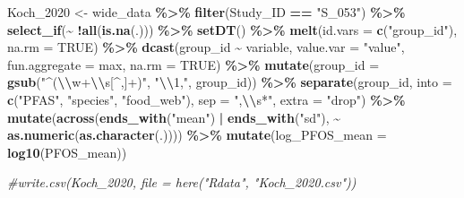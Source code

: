 \documentclass[
]{article}
\newenvironment{Shaded}{\begin{snugshade}}{\end{snugshade}}
\newcommand{\AttributeTok}[1]{\textcolor[rgb]{0.13,0.29,0.53}{#1}}
\newcommand{\CommentTok}[1]{\textcolor[rgb]{0.56,0.35,0.01}{\textit{#1}}}
\newcommand{\ConstantTok}[1]{\textcolor[rgb]{0.56,0.35,0.01}{#1}}
\newcommand{\FunctionTok}[1]{\textcolor[rgb]{0.13,0.29,0.53}{\textbf{#1}}}
\newcommand{\NormalTok}[1]{#1}
\newcommand{\OtherTok}[1]{\textcolor[rgb]{0.56,0.35,0.01}{#1}}
\newcommand{\SpecialCharTok}[1]{\textcolor[rgb]{0.81,0.36,0.00}{\textbf{#1}}}
\newcommand{\StringTok}[1]{\textcolor[rgb]{0.31,0.60,0.02}{#1}}
\begin{document}
\begin{Shaded}
\begin{Highlighting}[]
\NormalTok{Koch\_2020 }\OtherTok{\textless{}{-}}\NormalTok{ wide\_data }\SpecialCharTok{\%\textgreater{}\%} 
  \FunctionTok{filter}\NormalTok{(Study\_ID }\SpecialCharTok{==} \StringTok{"S\_053"}\NormalTok{) }\SpecialCharTok{\%\textgreater{}\%}
  \FunctionTok{select\_if}\NormalTok{(}\SpecialCharTok{\textasciitilde{}} \SpecialCharTok{!}\FunctionTok{all}\NormalTok{(}\FunctionTok{is.na}\NormalTok{(.))) }\SpecialCharTok{\%\textgreater{}\%} 
  \FunctionTok{setDT}\NormalTok{() }\SpecialCharTok{\%\textgreater{}\%} 
  \FunctionTok{melt}\NormalTok{(}\AttributeTok{id.vars =} \FunctionTok{c}\NormalTok{(}\StringTok{"group\_id"}\NormalTok{), }\AttributeTok{na.rm =} \ConstantTok{TRUE}\NormalTok{) }\SpecialCharTok{\%\textgreater{}\%} 
  \FunctionTok{dcast}\NormalTok{(group\_id }\SpecialCharTok{\textasciitilde{}}\NormalTok{ variable, }\AttributeTok{value.var =} \StringTok{"value"}\NormalTok{, }\AttributeTok{fun.aggregate =}\NormalTok{ max, }\AttributeTok{na.rm =} \ConstantTok{TRUE}\NormalTok{) }\SpecialCharTok{\%\textgreater{}\%} 
  \FunctionTok{mutate}\NormalTok{(}\AttributeTok{group\_id =} \FunctionTok{gsub}\NormalTok{(}\StringTok{"\^{}(}\SpecialCharTok{\textbackslash{}\textbackslash{}}\StringTok{w+}\SpecialCharTok{\textbackslash{}\textbackslash{}}\StringTok{s[\^{},]+)"}\NormalTok{, }\StringTok{"}\SpecialCharTok{\textbackslash{}\textbackslash{}}\StringTok{1,"}\NormalTok{, group\_id)) }\SpecialCharTok{\%\textgreater{}\%} 
  \FunctionTok{separate}\NormalTok{(group\_id, }\AttributeTok{into =} \FunctionTok{c}\NormalTok{(}\StringTok{"PFAS"}\NormalTok{, }\StringTok{"species"}\NormalTok{, }\StringTok{"food\_web"}\NormalTok{), }\AttributeTok{sep =} \StringTok{",}\SpecialCharTok{\textbackslash{}\textbackslash{}}\StringTok{s*"}\NormalTok{, }\AttributeTok{extra =} \StringTok{"drop"}\NormalTok{) }\SpecialCharTok{\%\textgreater{}\%} 
  \FunctionTok{mutate}\NormalTok{(}\FunctionTok{across}\NormalTok{(}\FunctionTok{ends\_with}\NormalTok{(}\StringTok{"mean"}\NormalTok{) }\SpecialCharTok{|} \FunctionTok{ends\_with}\NormalTok{(}\StringTok{"sd"}\NormalTok{), }\SpecialCharTok{\textasciitilde{}} \FunctionTok{as.numeric}\NormalTok{(}\FunctionTok{as.character}\NormalTok{(.)))) }\SpecialCharTok{\%\textgreater{}\%} 
  \FunctionTok{mutate}\NormalTok{(}\AttributeTok{log\_PFOS\_mean =} \FunctionTok{log10}\NormalTok{(PFOS\_mean))}

\CommentTok{\#write.csv(Koch\_2020, file = here("Rdata", "Koch\_2020.csv"))}


\end{Highlighting}
\end{Shaded}
\end{document}
